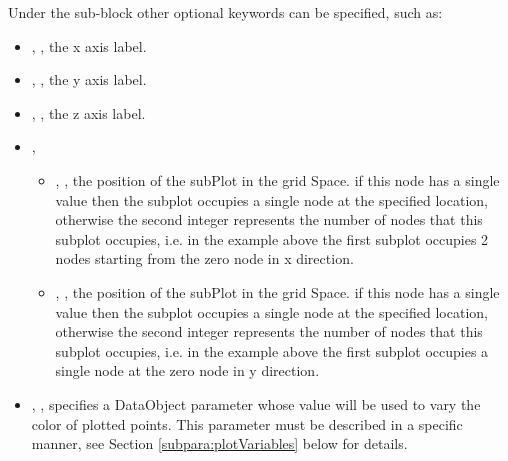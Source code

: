 Under the  sub-block other optional keywords can be specified, such as:
\begin{itemize}
  \item {}, , the x axis
  label.
  \item {}, , the y axis
  label.
  \item {}, ,
  the z axis label.
  \item {}, 
  \begin{itemize}
	\item {}, , the position of the subPlot in the grid Space.
	if this node has a single value then the subplot occupies a single node at the specified location, otherwise
        the second integer represents the number of nodes that this subplot occupies, i.e. in the example above the
        first subplot occupies 2 nodes starting from the zero node in x direction.
	\item {}, , the position of the subPlot in the grid Space.
	if this node has a single value then the subplot occupies a single node at the specified location, otherwise
        the second integer represents the number of nodes that this subplot occupies, i.e. in the example above the
        first subplot occupies a single node at the zero node in y direction.
  \end{itemize}
  \item {}, , specifies a DataObject parameter whose value will be used
	to vary the color of plotted points.  This parameter must be described in a specific manner, see Section \ref{subpara:plotVariables}
	below for details.
 \end{itemize}

